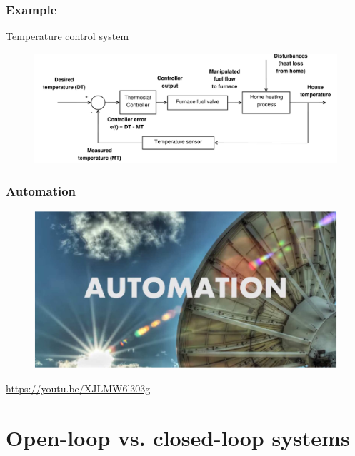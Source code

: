 \documentclass{beamer}
\begin{document}

\begin{frame}
\frametitle{Example}
\vspace{-3ex}
Temperature control system\\
\bigskip
\begin{figure}
\includegraphics[width=1\linewidth]{temp_control_system}
\end{figure}
\end{frame}


\begin{frame}
\frametitle{Automation}
\begin{figure}
\includegraphics[width=1\linewidth]{automation}
\end{figure}
\url{https://youtu.be/XJLMW6l303g}
\end{frame}

\section{Open-loop vs. closed-loop systems} 
\end{document}
